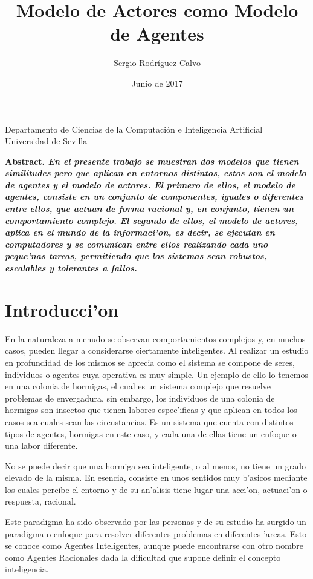 \documentclass[12pt]{article}
\title{Modelo de Actores como Modelo de Agentes}
\author{Sergio Rodr\'iguez Calvo}
\date{Junio de 2017}
\begin{document}
    \maketitle
    \thispagestyle{empty}
    \begin{center}
      Departamento de Ciencias de la Computaci\'on e
      Inteligencia Artificial \\
      Universidad de Sevilla
      \end{center}
  \bf{Abstract. }\rm
    \emph{En el presente trabajo se muestran dos modelos que tienen similitudes
    pero que aplican en entornos distintos, estos son el modelo de agentes y
    el modelo de actores. El primero de ellos, el modelo de agentes, consiste en
    un conjunto de componentes, iguales o diferentes entre ellos, que actuan de forma
    racional y, en conjunto, tienen un comportamiento complejo. El segundo de ellos,
    el modelo de actores, aplica en el mundo de la informaci'on, es decir, se ejecutan
    en computadores y se comunican entre ellos realizando cada uno peque'nas tareas,
    permitiendo que los sistemas sean robustos, escalables y tolerantes a fallos.}
\section{Introducci'on}
En la naturaleza a menudo se observan comportamientos complejos y, en muchos casos,
pueden llegar a considerarse ciertamente inteligentes. Al realizar un estudio en profundidad
de los mismos se aprecia como el sistema se compone de seres, individuos o agentes cuya operativa
es muy simple. Un ejemplo de ello lo tenemos en una colonia de hormigas, el cual es un
sistema complejo que resuelve problemas de envergadura, sin embargo, los individuos de
una colonia de hormigas son insectos que tienen labores espec'ificas y que aplican en
todos los casos sea cuales sean las circustancias. Es un sistema que cuenta con distintos
tipos de agentes, hormigas en este caso, y cada una de ellas tiene un enfoque o una labor diferente.

No se puede decir que una hormiga sea inteligente, o al menos, no tiene un grado elevado de la misma.
En esencia, consiste en unos sentidos muy b'asicos mediante los cuales percibe el entorno y
de su an'alisis tiene lugar una acci'on, actuaci'on o respuesta, racional.

Este paradigma ha sido observado por las personas y de su estudio ha surgido un paradigma o
enfoque para resolver diferentes problemas en diferentes 'areas. Esto se conoce como Agentes
Inteligentes, aunque puede encontrarse con otro nombre como Agentes Racionales dada la dificultad
que supone definir el concepto inteligencia.
\end{document}
